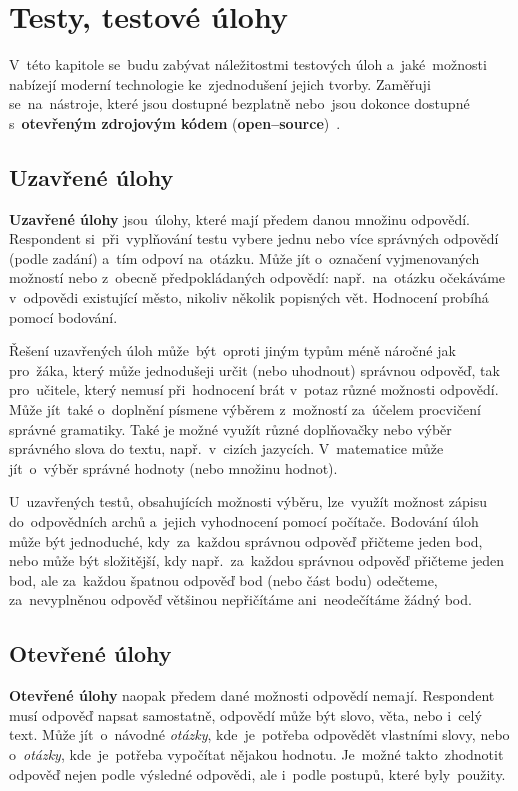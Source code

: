 \documentclass[11pt,a4paper]{report}
\begin{document}
    \chapter{Testy, testové úlohy}
         V~této kapitole se~budu zabývat náležitostmi testových úloh a~jaké~možnosti nabízejí moderní technologie ke~zjednodušení jejich tvorby. Zaměřuji se~na~nástroje, které jsou dostupné bezplatně nebo~jsou dokonce dostupné s~\textbf{otevřeným zdrojovým kódem} (\textbf{open--source})~\cite{fogel:opensource}.

        \section{Uzavřené úlohy}
            \textbf{Uzavřené úlohy} jsou~úlohy, které mají předem danou množinu odpovědí. Respondent si~při~vyplňování testu vybere jednu nebo více správných odpovědí (podle zadání) a~tím odpoví na~otázku. Může jít o~označení vyjmenovaných možností nebo z~obecně předpokládaných odpovědí: např.~na~otázku  očekáváme v~odpovědi existující město, nikoliv několik popisných vět. Hodnocení probíhá pomocí bodování.

            Řešení uzavřených úloh může~být~oproti jiným typům méně náročné jak pro~žáka, který může jednodušeji určit (nebo uhodnout) správnou odpověď, tak pro~učitele, který nemusí při~hodnocení brát v~potaz různé možnosti odpovědí. 
            Může jít~také o~doplnění písmene výběrem z~možností za~účelem procvičení správné gramatiky. Také je možné využít různé doplňovačky nebo výběr správného slova do textu, např.~v~cizích jazycích. V~matematice může jít~o~výběr správné hodnoty (nebo množinu hodnot). 
            
            U~uzavřených testů, obsahujících možnosti výběru, lze~využít možnost zápisu do~odpovědních archů a~jejich vyhodnocení pomocí počítače.
            Bodování úloh může být jednoduché, kdy~za~každou správnou odpověď přičteme jeden bod, nebo může být složitější, kdy např.~za~každou správnou odpověď přičteme jeden bod, ale za~každou špatnou odpověď bod (nebo část bodu) odečteme, za~nevyplněnou odpověď většinou nepřičítáme ani~neodečítáme žádný bod.

        \section{Otevřené úlohy}
            \textbf{Otevřené úlohy} naopak předem dané možnosti odpovědí nemají. Respondent musí odpověď napsat samostatně, odpovědí může být slovo, věta, nebo i~celý text. Může jít~o~návodné \emph{otázky}, kde~je~potřeba odpovědět vlastními slovy, nebo o~\emph{otázky}, kde~je~potřeba vypočítat nějakou hodnotu. Je~možné takto~zhodnotit odpověď nejen podle výsledné odpovědi, ale i~podle postupů, které byly~použity.
\end{document}

